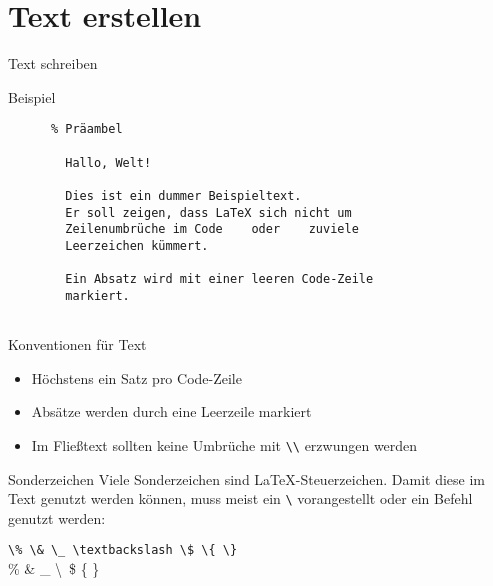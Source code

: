 \section{Text erstellen}

\begin{frame}[fragile]{Text schreiben}
  \begin{block}{Beispiel}
    \begin{lstlisting}
      % Präambel
      
        Hallo, Welt!

        Dies ist ein dummer Beispieltext.
        Er soll zeigen, dass LaTeX sich nicht um
        Zeilenumbrüche im Code    oder    zuviele
        Leerzeichen kümmert.

        Ein Absatz wird mit einer leeren Code-Zeile
        markiert.
      
    \end{lstlisting}
  \end{block}
\end{frame}

\begin{frame}[fragile]{Konventionen für Text}
  \begin{itemize}
    \item Höchstens ein Satz pro Code-Zeile
    \item Absätze werden durch eine Leerzeile markiert
    \item Im Fließtext sollten keine Umbrüche mit \verb+\\+ erzwungen werden
  \end{itemize}
  \begin{alertblock}{Sonderzeichen}
    Viele Sonderzeichen sind \LaTeX-Steuerzeichen.
    Damit diese im Text genutzt werden können, muss meist ein \verb+\+ vorangestellt oder ein Befehl genutzt werden:
    \begin{center}
      \verb+\% \& \_ \textbackslash \$ \{ \}+ \\
      \% \& \_ \textbackslash\ \$ \{ \}
    \end{center}
  \end{alertblock}
\end{frame}

